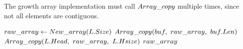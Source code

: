 \HdrGrowthArrayImpl

The growth array implementation must call $Array\_copy$ multiple times, since not all elements are contiguous.

\begin{algorithm}[H]
	\begin{algorithmic}
		\Function{$\FuncToArray$}{$\VarList$}
		\State $raw\_array \gets New\_array(L.Size)$
			\State $\FuncArrayCopy(\LclBuffer,\ \LclRawArray,\ \LclBuffer.\FieldLength)$
		\EndFor
		\State $\FuncArrayCopy(\VarList.\FieldHead,\ \LclRawArray,\ \VarList.\FieldHeadSize)$
		\State \Return $raw\_array$
		\EndFunction
	\end{algorithmic}
\end{algorithm}